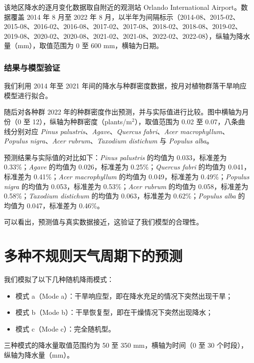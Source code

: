 \documentclass[11pt,a4paper]{ctexart}
\begin{document}
该地区降水的逐月变化数据取自附近的观测站 Orlando International Airport。数据覆盖 2014 年 8 月至 2022 年 8 月，以半年为间隔标示（2014-08、2015-02、2015-08、2016-02、2016-08、2017-02、2017-08、2018-02、2018-08、2019-02、2019-08、2020-02、2020-08、2021-02、2021-08、2022-02、2022-08），纵轴为降水量（mm），取值范围为 0 至 600 mm，横轴为日期。

\subsubsection{结果与模型验证}

我们利用 2014 年至 2021 年间的降水与种群密度数据，按月对植物群落干旱响应模型进行拟合。

随后对各种群 2022 年的种群密度作出预测，并与实际值进行比较。图中横轴为月份（0 至 12），纵轴为种群密度（plants/m$^2$），取值范围为 0.02 至 0.07，八条曲线分别对应 \textit{Pinus palustris}、\textit{Agave}、\textit{Quercus fabri}、\textit{Acer macrophyllum}、\textit{Populus nigra}、\textit{Acer rubrum}、\textit{Taxodium distichum} 与 \textit{Populus alba}。

预测结果与实际值的对比如下：\textit{Pinus palustris} 的均值为 0.033，标准差为 0.33\%；\textit{Agave} 的均值为 0.026，标准差为 0.25\%；\textit{Quercus fabri} 的均值为 0.041，标准差为 0.41\%；\textit{Acer macrophyllum} 的均值为 0.049，标准差为 0.49\%；\textit{Populus nigra} 的均值为 0.053，标准差为 0.53\%；\textit{Acer rubrum} 的均值为 0.058，标准差为 0.58\%；\textit{Taxodium distichum} 的均值为 0.063，标准差为 0.62\%；\textit{Populus alba} 的均值为 0.047，标准差为 0.46\%。

可以看出，预测值与真实数据接近，这验证了我们模型的合理性。
\section{多种不规则天气周期下的预测}

我们模拟了以下几种随机降雨模式：

\begin{itemize}
\item 模式 a（Mode a）：干旱响应型，即在降水充足的情况下突然出现干旱；
\item 模式 b（Mode b）：干旱恢复型，即在干燥情况下突然出现降水；
\item 模式 c（Mode c）：完全随机型。
\end{itemize}

三种模式的降水量取值范围约为 50 至 350 mm，横轴为时间（0 至 30 个时段），纵轴为降水量（mm）。
\end{document}
